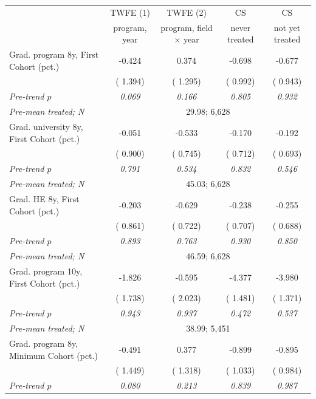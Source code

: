 \begin{tabular}{lcccc}
\toprule
 & TWFE (1) & TWFE (2) & CS & CS \\
 & program, year & program, field \(\times\) year & never treated & not yet treated \\
\midrule
Grad. program 8y, First Cohort (pct.) &  -0.424 &   0.374 &  -0.698 &  -0.677 \\
 & ( 1.394) & ( 1.295) & ( 0.992) & ( 0.943) \\
\quad \textit{Pre-trend \(p\)} & \textit{0.069} & \textit{0.166} & \textit{0.805} & \textit{0.932} \\
\quad \textit{Pre-mean treated; N} & \multicolumn{4}{c}{\scriptsize   29.98;  6,628} \\
\addlinespace
Grad. university 8y, First Cohort (pct.) &  -0.051 &  -0.533 &  -0.170 &  -0.192 \\
 & ( 0.900) & ( 0.745) & ( 0.712) & ( 0.693) \\
\quad \textit{Pre-trend \(p\)} & \textit{0.791} & \textit{0.534} & \textit{0.832} & \textit{0.546} \\
\quad \textit{Pre-mean treated; N} & \multicolumn{4}{c}{\scriptsize   45.03;  6,628} \\
\addlinespace
Grad. HE 8y, First Cohort (pct.) &  -0.203 &  -0.629 &  -0.238 &  -0.255 \\
 & ( 0.861) & ( 0.722) & ( 0.707) & ( 0.688) \\
\quad \textit{Pre-trend \(p\)} & \textit{0.893} & \textit{0.763} & \textit{0.930} & \textit{0.850} \\
\quad \textit{Pre-mean treated; N} & \multicolumn{4}{c}{\scriptsize   46.59;  6,628} \\
\addlinespace
Grad. program 10y, First Cohort (pct.) &  -1.826 &  -0.595 &  -4.377\sym{***} &  -3.980\sym{***} \\
 & ( 1.738) & ( 2.023) & ( 1.481) & ( 1.371) \\
\quad \textit{Pre-trend \(p\)} & \textit{0.943} & \textit{0.937} & \textit{0.472} & \textit{0.537} \\
\quad \textit{Pre-mean treated; N} & \multicolumn{4}{c}{\scriptsize   38.99;  5,451} \\
\addlinespace
Grad. program 8y, Minimum Cohort (pct.) &  -0.491 &   0.377 &  -0.899 &  -0.895 \\
 & ( 1.449) & ( 1.318) & ( 1.033) & ( 0.984) \\
\quad \textit{Pre-trend \(p\)} & \textit{0.080} & \textit{0.213} & \textit{0.839} & \textit{0.987} \\

\end{tabular}
